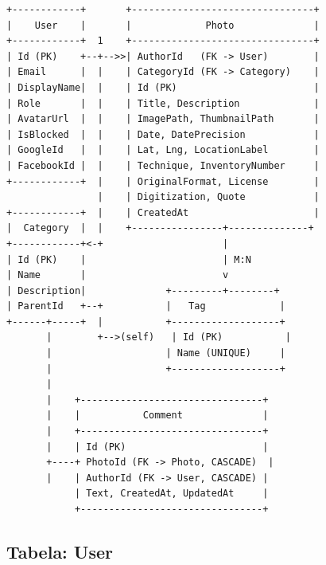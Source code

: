 \documentclass[12pt, a4paper]{article}
\begin{document}
\begin{lstlisting}[style=plain, caption={Uproszczony diagram encji}]
+------------+       +--------------------------------+
|    User    |       |             Photo              |
+------------+  1    +--------------------------------+
| Id (PK)    +--+-->>| AuthorId   (FK -> User)        |
| Email      |  |    | CategoryId (FK -> Category)    |
| DisplayName|  |    | Id (PK)                        |
| Role       |  |    | Title, Description             |
| AvatarUrl  |  |    | ImagePath, ThumbnailPath       |
| IsBlocked  |  |    | Date, DatePrecision            |
| GoogleId   |  |    | Lat, Lng, LocationLabel        |
| FacebookId |  |    | Technique, InventoryNumber     |
+------------+  |    | OriginalFormat, License        |
                |    | Digitization, Quote            |
+------------+  |    | CreatedAt                      |
|  Category  |  |    +----------------+--------------+
+------------+<-+                     |
| Id (PK)    |                        | M:N
| Name       |                        v
| Description|              +---------+--------+
| ParentId   +--+           |   Tag             |
+------+-----+  |           +-------------------+
       |        +-->(self)   | Id (PK)           |
       |                    | Name (UNIQUE)     |
       |                    +-------------------+
       |
       |    +--------------------------------+
       |    |           Comment              |
       |    +--------------------------------+
       |    | Id (PK)                        |
       +----+ PhotoId (FK -> Photo, CASCADE)  |
       |    | AuthorId (FK -> User, CASCADE) |
            | Text, CreatedAt, UpdatedAt     |
            +--------------------------------+
\end{lstlisting}

\subsection{Tabela: User}
\end{document}
